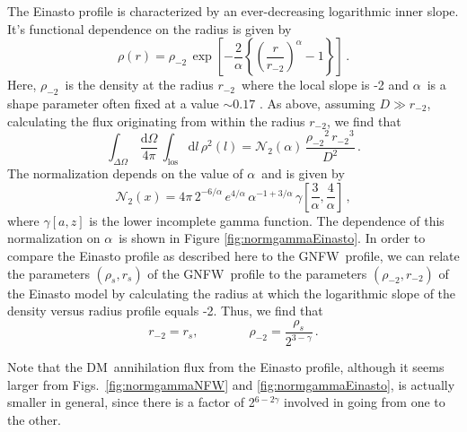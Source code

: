 \documentclass[aps,prd,twocolumn,amsmath,amssymb,floatfix,nofootinbib,10pt]{revtex4}
\newcommand{\NFW}{NFW}
\newcommand{\GNFW}{G\NFW}
\newcommand{\DM}{DM}
\newcommand{\dd}{\mathrm{d}}
\newcommand{\los}{los}
\newcommand{\rhos}{\ensuremath{\rho_s}}
\newcommand{\rs}{\ensuremath{r_s}}
\newcommand{\dist}{\ensuremath{D}}
\newcommand{\norm}{\ensuremath{\mathcal{N}}}
\newcommand{\normeinasto}{\ensuremath{\norm_2}}
\newcommand{\rhominustwo}{\ensuremath{\rho_{-2}}}
\newcommand{\rminustwo}{\ensuremath{r_{-2}}}
\newcommand{\alphaEinasto}{\ensuremath{\alpha}}
\begin{document}
The Einasto profile is characterized by an ever-decreasing logarithmic
inner slope. It's functional dependence on the radius is given by
\begin{equation}\label{eq:einasto}
\rho (r) = \rhominustwo\, \exp\left[-\frac{2}{\alpha}\left\{\left(\frac{r}{\rminustwo}\right)^{\alpha}-1\right\}\right]\, .
\end{equation}
Here, \rhominustwo\ is the density at the radius \rminustwo\ where the
local slope is -2 and \alphaEinasto\ is a shape parameter often fixed
at a value $\sim\!0.17$ \cite{2008MNRAS.391.1685S}. As above, assuming
$\dist \gg \rminustwo$, calculating the flux originating from within
the radius \rminustwo, we find that
\begin{equation}\label{eq:lumrhosrsEinasto}
\int_{\Delta\Omega}\,\frac{\dd\Omega}{4\pi}\,\int_{\mathrm{\los}} \dd
l\, \rho^2(l)= \normeinasto(\alpha)\, \frac{\rhominustwo^2\, \rminustwo^3}{\dist^2}\, .
\end{equation}
The normalization depends on the value of \alphaEinasto\ and is given
by
\begin{equation}\label{eq:normgammaEinasto}
\normeinasto(x) = 4 \pi \, 2^{-6/\alpha}\,e^{4/\alpha}\,
\alpha^{-1+3/\alpha}\,
\gamma\left[\frac{3}{\alpha},\frac{4}{\alpha}\right]\,
,
\end{equation}
where $\gamma[a,z]$ is the lower incomplete gamma function. The
dependence of this normalization on \alphaEinasto\ is shown in Figure
\ref{fig:normgammaEinasto}. In order to compare the Einasto profile as
described here to the \GNFW\ profile, we can relate the parameters
$(\rhos,\rs)$ of the \GNFW\ profile to the parameters
$(\rhominustwo,\rminustwo)$ of the Einasto model by calculating the
radius at which the logarithmic slope of the density versus radius
profile equals -2. Thus, we find that
\begin{equation}
\rminustwo = \rs,  \qquad \qquad \rhominustwo = \frac{\rhos}{2^{3-\gamma}}\, .
\end{equation}

Note that the \DM\ annihilation flux from the Einasto profile,
although it seems larger from Figs.~\ref{fig:normgammaNFW} and
\ref{fig:normgammaEinasto}, is actually smaller in general, since
there is a factor of 2$^{6-2\gamma}$ involved in going from one to the
other.
\end{document}
